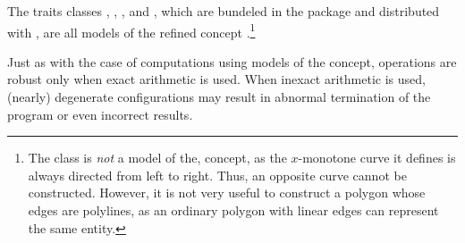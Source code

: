 The traits classes , 
, ,
 and , which are 
bundeled in the  package and distributed with \cgal,
are all models of the refined concept 
.\footnote{The
 class is {\em not} a model of the, 
 concept, as the
$x$-monotone curve it defines is always directed from left to right. Thus, an
opposite curve cannot be constructed. However, it is not very useful to
construct a polygon whose edges are polylines, as an ordinary polygon
with linear edges can represent the same entity.}

Just as with the case of computations using models of the 
 concept, operations are robust only
when exact arithmetic is used. When inexact arithmetic is used,
(nearly) degenerate configurations may result in abnormal termination
of the program or even incorrect results.

